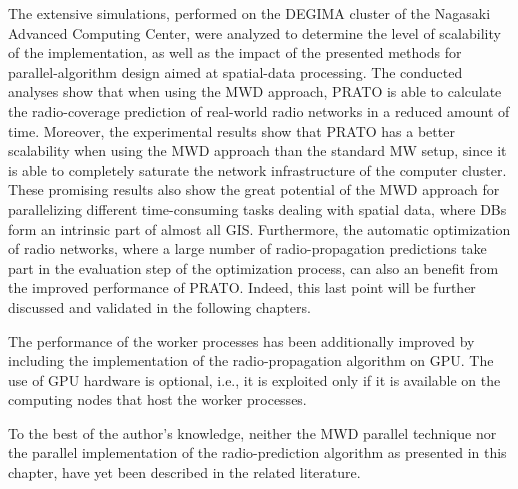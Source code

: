 The extensive simulations, performed on the DEGIMA cluster of the
Nagasaki Advanced Computing Center, were analyzed to determine the
level of scalability of the implementation, as well as the impact
of the presented methods for parallel-algorithm design aimed at spatial-data
processing. The conducted analyses show that when using the MWD approach,
PRATO is able to calculate the radio-coverage prediction of real-world
radio networks in a reduced amount of time. Moreover, the experimental
results show that PRATO has a better scalability when using the MWD
approach than the standard MW setup, since it is able to completely
saturate the network infrastructure of the computer cluster. These
promising results also show the great potential of the MWD approach
for parallelizing different time-consuming tasks dealing with spatial
data, where DBs form an intrinsic part of almost all GIS. Furthermore,
the automatic optimization of radio networks, where a large number
of radio-propagation predictions take part in the evaluation step
of the optimization process, can also an benefit from the improved
performance of PRATO. Indeed, this last point will be further discussed
and validated in the following chapters.

The performance of the worker processes has been additionally improved
by including the implementation of the radio-propagation algorithm
on GPU. The use of GPU hardware is optional, i.e., it is exploited
only if it is available on the computing nodes that host the worker
processes.

To the best of the author's knowledge, neither the MWD parallel technique
nor the parallel implementation of the radio-prediction algorithm
as presented in this chapter, have yet been described in the related
literature.
